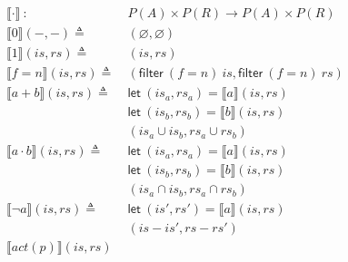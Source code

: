 \documentclass[12pt, letterpaper]{article}
\let\emptyset\varnothing
\begin{document}
    \begin{align*}
        \llbracket \cdot \rrbracket\ 
            :\ \ &
            P(A)\times P(R) \rightarrow P(A)\times P(R) 
            \\
        \llbracket 0 \rrbracket(-, -)
            \triangleq\ &
            (\emptyset , \emptyset)
            \\ %
        \llbracket 1 \rrbracket(\mathit{is}, \mathit{rs})
            \triangleq\ &
            (\mathit{is}, \mathit{rs})
            \\
        \llbracket f=n \rrbracket(\mathit{is}, \mathit{rs})
            \triangleq\ &
            (\mathsf{filter}\ (f=n)\ \mathit{is},
             \mathsf{filter}\ (f=n)\ \mathit{rs}) 
            \\
        \llbracket a + b \rrbracket(\mathit{is}, \mathit{rs})
            \triangleq\ &
            \mathsf{let}\ (\mathit{is}_a,\mathit{rs}_a) = \llbracket a \rrbracket(\mathit{is}, \mathit{rs}) \\
            &\mathsf{let}\ (\mathit{is}_b,\mathit{rs}_b) =
            \llbracket b \rrbracket(\mathit{is}, \mathit{rs}) \\
            &(\mathit{is}_a \cup \mathit{is}_b,\mathit{rs}_a \cup \mathit{rs}_b) 
            \\
        \llbracket a \cdot b \rrbracket(\mathit{is}, \mathit{rs})
            \triangleq\ &
            \mathsf{let}\ (\mathit{is}_a,\mathit{rs}_a) = \llbracket a \rrbracket(\mathit{is}, \mathit{rs}) \\
            &\mathsf{let}\ (\mathit{is}_b,\mathit{rs}_b) =
            \llbracket b \rrbracket(\mathit{is}, \mathit{rs}) \\
            &(\mathit{is}_a \cap \mathit{is}_b,\mathit{rs}_a \cap \mathit{rs}_b) 
            \\
        \llbracket \neg a \rrbracket(\mathit{is}, \mathit{rs})
            \triangleq\ &
            \mathsf{let}\ (\mathit{is}',\mathit{rs}') = \llbracket a \rrbracket(\mathit{is}, \mathit{rs}) \\
            &(\mathit{is} - \mathit{is}',\mathit{rs} - \mathit{rs}') 
            \\
        \llbracket act(p) \rrbracket(\mathit{is}, \mathit{rs})

\end{align*}
\end{document}
